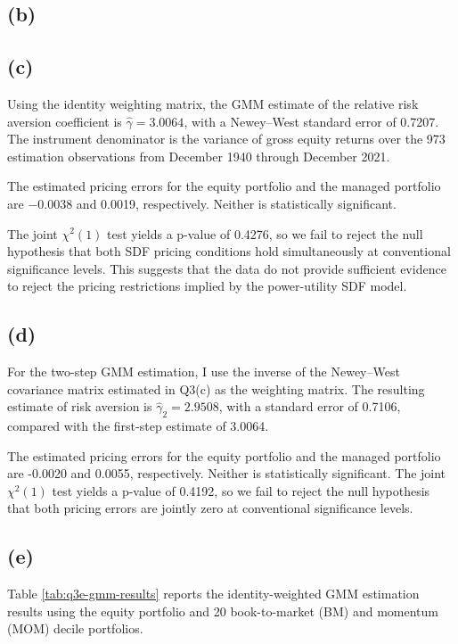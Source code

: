 \documentclass[11pt]{article}
\begin{document}
\clearpage
\subsection*{(b)}


\FloatBarrier

\clearpage
\subsection*{(c)}
Using the identity weighting matrix, the GMM estimate of the relative risk aversion coefficient is $\hat\gamma=3.0064$, with a Newey–West standard error of 0.7207. The instrument denominator is the variance of gross equity returns over the 973 estimation observations from December 1940 through December 2021.

The estimated pricing errors for the equity portfolio and the managed portfolio are $-0.0038$ and 0.0019, respectively. Neither is statistically significant.

The joint $\chi^2(1)$ test yields a p-value of 0.4276, so we fail to reject the null hypothesis that both SDF pricing conditions hold simultaneously at conventional significance levels.
This suggests that the data do not provide sufficient evidence to reject the pricing restrictions implied by the power-utility SDF model.

%
\FloatBarrier

\clearpage
\subsection*{(d)}
For the two-step GMM estimation, I use the inverse of the Newey–West covariance matrix estimated in Q3(c) as the weighting matrix. The resulting estimate of risk aversion is \(\hat\gamma_2=2.9508\), with a standard error of 0.7106, compared with the first-step estimate of 3.0064.

The estimated pricing errors for the equity portfolio and the managed portfolio are -0.0020 and 0.0055, respectively. Neither is statistically significant. The joint \(\chi^2(1)\) test yields a p-value of 0.4192, so we fail to reject the null hypothesis that both pricing errors are jointly zero at conventional significance levels.

\FloatBarrier

\clearpage
\subsection*{(e)}
Table \ref{tab:q3e-gmm-results} reports the identity-weighted GMM estimation results using the equity portfolio and 20 book-to-market (BM) and momentum (MOM) decile portfolios.
\end{document}

